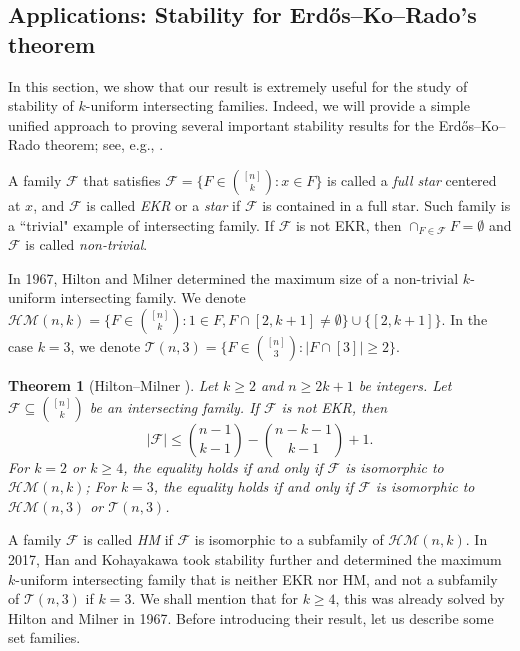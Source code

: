 \documentclass[11pt]{article}
\numberwithin{equation}{section}
\newtheorem{theorem}{Theorem}[section]
\begin{document}
\subsection{Applications: Stability for Erd\H{o}s--Ko--Rado's theorem}

\label{sec-1-2}

In this section, we show that our result is extremely useful for the study of stability of $k$-uniform intersecting families. Indeed, we will provide a simple unified approach to proving several important stability results for the Erd\H{o}s--Ko--Rado theorem; see, e.g., \cite{H67,H17,H24}. 

A family $\mathcal{F}$ that satisfies  $\mathcal{F}=\big\{F\in \binom{[n]}{k}: x\in F\big\}$ is called a \textit{full star} centered at $x$, and $\mathcal{F}$ is called \textit{EKR} or a \textit{star} if
$\mathcal{F}$ is contained in a full star. Such family is a ``trivial" example of intersecting family. If $\mathcal{F}$ is not EKR, then  $\cap_{F\in\mathcal{F}}F=\emptyset$ and $\mathcal{F}$ is called \textit{non-trivial}.

In 1967,  Hilton and Milner \cite{H67} determined the maximum size of a non-trivial $k$-uniform intersecting family. 
We denote 
$\mathcal{HM}(n, k)=\big\{F \in\binom{[n]}{k}: 1 \in F, F \cap[2, k+1] \neq \emptyset\big\} \cup\{[2, k+1]\}$. In the case $k=3$, we denote 
$\mathcal{T}(n, 3)=\big\{F \in\binom{[n]}{3}:|F \cap[3]| \geq 2\big\}$. 

\begin{theorem}[Hilton--Milner \cite{H67}]
\label{H67}
Let $k \geq 2$ and $n \geq 2 k+1$ be integers. Let $\mathcal{F} \subseteq\binom{[n]}{k}$ be an intersecting family.  
If $\mathcal{F}$ is not EKR, then
$$
|\mathcal{F}|\leq\binom{n-1}{k-1}-\binom{n-k-1}{k-1}+1.
$$
For $k=2$ or $k\ge 4$, 
the equality holds if and only if $\mathcal{F}$ is isomorphic to $ \mathcal{HM}(n, k)$; 
For $k=3$, the equality holds if and only if $\mathcal{F}$ is isomorphic to $ \mathcal{HM}(n,3)$ or $ \mathcal{T}(n, 3)$.
\end{theorem}




A family $\mathcal{F}$ is called \textit{HM} if
$\mathcal{F}$ is isomorphic to a subfamily of $\mathcal{HM}(n, k)$.  In 2017, Han and Kohayakawa \cite{H17} took stability further and determined the maximum $k$-uniform intersecting family that is neither EKR nor HM, and not a subfamily of $\mathcal{T}(n, 3)$ if $k=3$. We shall mention that for $k\geq 4$, this was already solved by Hilton and Milner \cite{H67} in 1967. Before introducing their result, let us  describe some set families.
\end{document}
